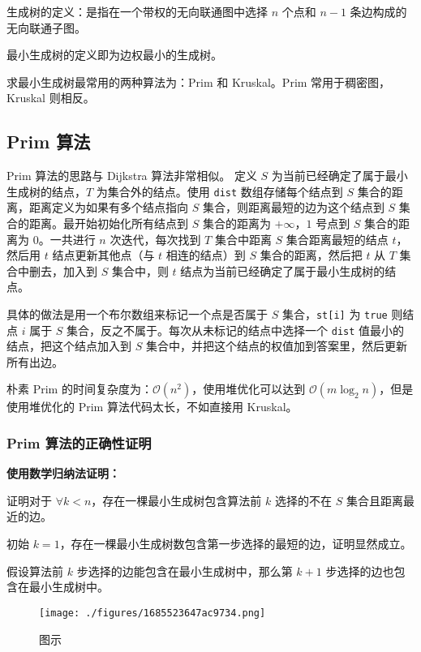 

生成树的定义：是指在一个带权的无向联通图中选择 $n$ 个点和 $n - 1$ 条边构成的无向联通子图。

最小生成树的定义即为边权最小的生成树。

求最小生成树最常用的两种算法为：Prim 和 Kruskal。Prim 常用于稠密图，Kruskal 则相反。

\subsection{Prim 算法}

Prim 算法的思路与 Dijkstra 算法非常相似。
定义 $S$ 为当前已经确定了属于最小生成树的结点，$T$ 为集合外的结点。使用 \verb|dist| 数组存储每个结点到 $S$ 集合的距离，距离定义为如果有多个结点指向 $S$ 集合，则距离最短的边为这个结点到 $S$ 集合的距离。最开始初始化所有结点到 $S$ 集合的距离为 $+\infty$，$1$ 号点到 $S$ 集合的距离为 $0$。一共进行 $n$ 次迭代，每次找到 $T$ 集合中距离 $S$ 集合距离最短的结点 $t$，然后用 $t$ 结点更新其他点（与 $t$ 相连的结点）到 $S$ 集合的距离，然后把 $t$ 从 $T$ 集合中删去，加入到 $S$ 集合中，则 $t$ 结点为当前已经确定了属于最小生成树的结点。

具体的做法是用一个布尔数组来标记一个点是否属于 $S$ 集合，\verb|st[i]| 为 \verb|true| 则结点 $i$ 属于 $S$ 集合，反之不属于。每次从未标记的结点中选择一个 \verb|dist| 值最小的结点，把这个结点加入到 $S$ 集合中，并把这个结点的权值加到答案里，然后更新所有出边。

朴素 Prim 的时间复杂度为：$\mathcal{O}(n^2)$，使用堆优化可以达到 $\mathcal{O}(m \log_2 n)$，但是使用堆优化的 Prim 算法代码太长，不如直接用 Kruskal。

\subsubsection{Prim 算法的正确性证明}

\textbf{使用数学归纳法证明：}

证明对于 $\forall k < n$，存在一棵最小生成树包含算法前 $k$ 选择的不在 $S$ 集合且距离最近的边。

初始 $k = 1$，存在一棵最小生成树数包含第一步选择的最短的边，证明显然成立。

假设算法前 $k$ 步选择的边能包含在最小生成树中，那么第 $k + 1$ 步选择的边也包含在最小生成树中。

\begin{figure}[ht]
\centering
\texttt{[image: ./figures/1685523647ac9734.png]}
\caption{图示} \label{fig_Prim_1}
\end{figure}

